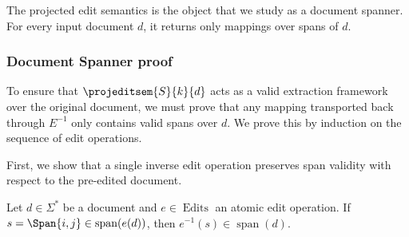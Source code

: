 The projected edit semantics is the object that we study as a document spanner. For every input document $d$, it returns only mappings over spans of $d$.

\subsubsection{Document Spanner proof}

To ensure that $\projeditsem{S}{k}{d}$ acts as a valid extraction framework over the original document, we must prove that any mapping transported back through $E^{-1}$ only contains valid spans over $d$. We prove this by induction on the sequence of edit operations.

First, we show that a single inverse edit operation preserves span validity with respect to the pre-edited document.

\begin{lemma}\label{lemma:single_edit_validity}
	Let $d \in \Sigma^*$ be a document and $e \in \operatorname{Edits}$ an atomic edit operation. 
	If $s = \Span{i,j} \in \operatorname{span}(e(d))$, then $e^{-1}(s) \in \operatorname{span}(d)$.
\end{lemma}

